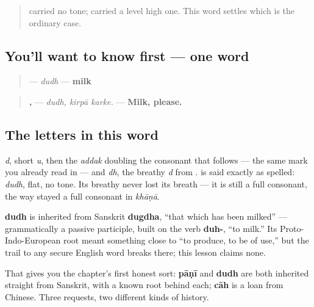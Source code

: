 \label{lesson:PA-C10-dudh}



\begin{quote}
\textbf{} carried no tone; \textbf{} carried a level high one. This word settles which is the ordinary case.
\end{quote}

\subsection*{You'll want to know first — one word}
\begin{quote}
\textbf{} — \emph{dudh} — \textbf{milk}
\end{quote}

\begin{quote}
\textbf{,  } — \emph{dudh, kirpā karke.} — \textbf{Milk, please.}
\end{quote}

\subsection*{The letters in this word}
\textbf{} \emph{d}, \textbf{} short \emph{u}, then the \textbf{} \emph{addak} doubling the consonant that follows — the same mark you already read in \textbf{} — and \textbf{} \emph{dh}, the breathy \emph{d} from \textbf{}. \textbf{} is said exactly as spelled: \emph{dudh}, flat, no tone. Its breathy \textbf{} never lost its breath — it is still a full consonant, the way \textbf{} stayed a full consonant in \emph{khāṇā}.

\begin{cousinweb}
\textbf{dudh} is inherited from Sanskrit \textbf{dugdha}, \textquotedblleft{}that which has been milked\textquotedblright{} — grammatically a passive participle, built on the verb \textbf{duh-}, \textquotedblleft{}to milk.\textquotedblright{} Its Proto-Indo-European root meant something close to \textquotedblleft{}to produce, to be of use,\textquotedblright{} but the trail to any secure English word breaks there; this lesson claims none.

That gives you the chapter's first honest sort: \textbf{pāṇī} and \textbf{dudh} are both inherited straight from Sanskrit, with a known root behind each; \textbf{cāh} is a loan from Chinese. Three requests, two different kinds of history.
\end{cousinweb}

